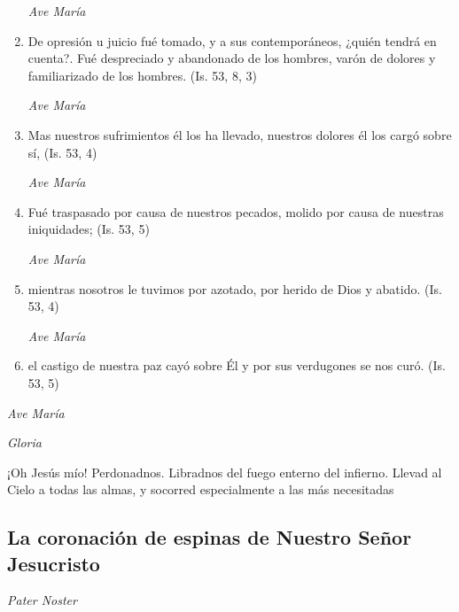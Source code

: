 \documentclass[a4paper,11pt, oneside]{report}
\begin{document}
\begin{enumerate}
          \textit{Ave María}

          \item De opresión u juicio fué tomado, y a sus contemporáneos, ¿quién tendrá en cuenta?. Fué despreciado y abandonado de los hombres,
          varón de dolores y familiarizado de los hombres. (Is. 53, 8, 3)

          \textit{Ave María}

          \item Mas nuestros sufrimientos él los ha llevado, nuestros dolores él los cargó sobre sí, (Is. 53, 4)

          \textit{Ave María}

          \item Fué traspasado por causa de nuestros pecados, molido por causa de nuestras iniquidades; (Is. 53, 5)

          \textit{Ave María}

          \item mientras nosotros le tuvimos por azotado, por herido de Dios y abatido. (Is. 53, 4)

          \textit{Ave María}

          \item el castigo de nuestra paz cayó sobre Él y por sus verdugones se nos curó. (Is. 53, 5)

        \end{enumerate}

        \textit{Ave María} \par
        \indent\textit{Gloria} \par
        \indent¡Oh Jesús mío! Perdonadnos. Libradnos del fuego enterno del infierno. Llevad al Cielo a todas las almas, y socorred especialmente a las más 
        necesitadas
      
      \subsection*{La coronación de espinas de Nuestro Señor Jesucristo}
      
        \textit{Pater Noster}
\end{document}
